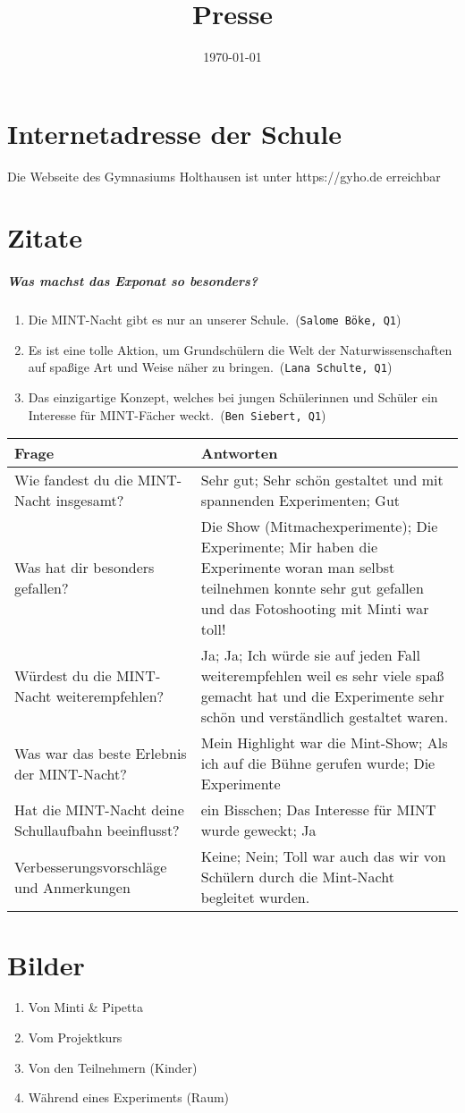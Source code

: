 \documentclass[12pt,a4paper]{report}
\begin{document}
	\bsremovechaptertitle
	\title{Presse}
	\date{\today}
	\maketitle
	\noindent
	\chapter{Internetadresse der Schule}
	Die Webseite des Gymnasiums Holthausen ist unter \color{blue}https://gyho.de \color{black} erreichbar 
	\chapter{Zitate}
	\paragraph{Was machst das Exponat so besonders?} \mbox{}
	\begin{enumerate}
		\item \dq Die MINT-Nacht gibt es nur an unserer Schule.\dq\ (\texttt{Salome Böke, Q1})
		\item \dq Es ist eine tolle Aktion, um Grundschülern die Welt der Naturwissenschaften auf spaßige Art und Weise näher zu bringen.\dq\ (\texttt{Lana Schulte, Q1})
		\item \dq Das einzigartige Konzept, welches bei jungen Schülerinnen und Schüler ein Interesse für MINT-Fächer weckt.\dq\ (\texttt{Ben Siebert, Q1})
	\end{enumerate}
	\begin{tabularx}{\textwidth}{|X|X|}
		\hline
		Frage & Antworten \\
		\hline
		Wie fandest du die MINT-Nacht insgesamt? & Sehr gut;  Sehr schön gestaltet und mit spannenden Experimenten; Gut \\
		\hline
		Was hat dir besonders gefallen? & Die Show (Mitmachexperimente); Die Experimente; Mir haben die Experimente woran man selbst teilnehmen konnte sehr gut gefallen und das Fotoshooting mit Minti war toll! \\
		\hline
		Würdest du die MINT-Nacht weiterempfehlen? & Ja; Ja;  Ich würde sie auf jeden Fall weiterempfehlen weil es sehr viele spaß gemacht hat und die Experimente sehr schön und verständlich gestaltet waren. \\
		\hline
		Was war das beste Erlebnis der MINT-Nacht? & Mein Highlight war die Mint-Show; Als ich auf die Bühne gerufen wurde; Die Experimente \\
		\hline
		Hat die MINT-Nacht deine Schullaufbahn beeinflusst? & ein Bisschen; Das Interesse für MINT wurde geweckt; Ja \\
		\hline
		Verbesserungsvorschläge und Anmerkungen & Keine; Nein; 
Toll war auch das wir von Schülern durch die Mint-Nacht begleitet wurden. \\
		\hline
	\end{tabularx}
	\chapter{Bilder}
	\begin{enumerate}
		\item Von Minti \& Pipetta
		\item Vom Projektkurs
		\item Von den Teilnehmern (Kinder)
		\item Während eines Experiments (Raum)
	\end{enumerate}
	
\end{document}
